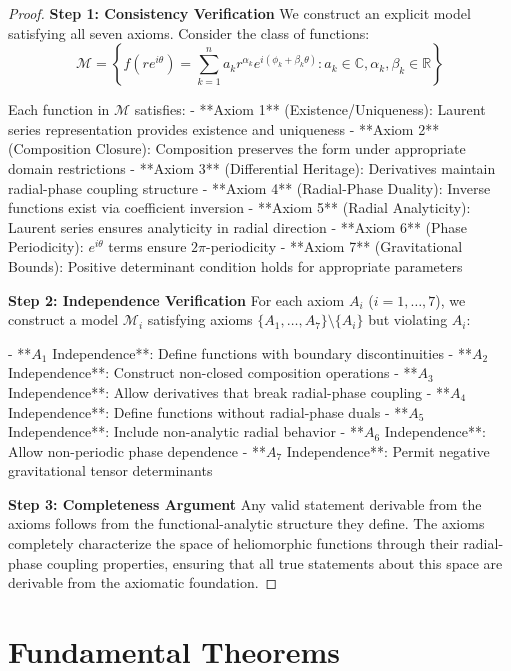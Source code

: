 \begin{proof}
\textbf{Step 1: Consistency Verification}
We construct an explicit model satisfying all seven axioms. Consider the class of functions:
$$\mathcal{M} = \left\{f(re^{i\theta}) = \sum_{k=1}^n a_k r^{\alpha_k} e^{i(\phi_k + \beta_k \theta)} : a_k \in \mathbb{C}, \alpha_k, \beta_k \in \mathbb{R}\right\}$$

Each function in $\mathcal{M}$ satisfies:
- **Axiom 1** (Existence/Uniqueness): Laurent series representation provides existence and uniqueness
- **Axiom 2** (Composition Closure): Composition preserves the form under appropriate domain restrictions
- **Axiom 3** (Differential Heritage): Derivatives maintain radial-phase coupling structure
- **Axiom 4** (Radial-Phase Duality): Inverse functions exist via coefficient inversion
- **Axiom 5** (Radial Analyticity): Laurent series ensures analyticity in radial direction
- **Axiom 6** (Phase Periodicity): $e^{i\theta}$ terms ensure $2\pi$-periodicity
- **Axiom 7** (Gravitational Bounds): Positive determinant condition holds for appropriate parameters

\textbf{Step 2: Independence Verification}
For each axiom $A_i$ ($i = 1, \ldots, 7$), we construct a model $\mathcal{M}_i$ satisfying axioms $\{A_1, \ldots, A_7\} \setminus \{A_i\}$ but violating $A_i$:

- **$A_1$ Independence**: Define functions with boundary discontinuities
- **$A_2$ Independence**: Construct non-closed composition operations
- **$A_3$ Independence**: Allow derivatives that break radial-phase coupling
- **$A_4$ Independence**: Define functions without radial-phase duals
- **$A_5$ Independence**: Include non-analytic radial behavior
- **$A_6$ Independence**: Allow non-periodic phase dependence
- **$A_7$ Independence**: Permit negative gravitational tensor determinants

\textbf{Step 3: Completeness Argument}
Any valid statement derivable from the axioms follows from the functional-analytic structure they define. The axioms completely characterize the space of heliomorphic functions through their radial-phase coupling properties, ensuring that all true statements about this space are derivable from the axiomatic foundation.
\end{proof}

\section{Fundamental Theorems}


